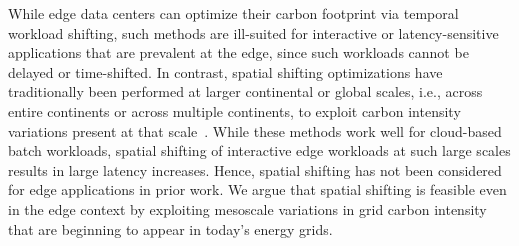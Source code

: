 While edge data centers can optimize their carbon footprint via temporal workload shifting, such methods are ill-suited for interactive or latency-sensitive applications that are prevalent at the edge, since such workloads cannot be delayed or time-shifted. In contrast, spatial shifting optimizations have traditionally been performed at larger continental or global scales, i.e., across entire continents or across multiple continents, to exploit carbon intensity variations present at that scale~\cite{cloudcarbon, Gsteiger2024:Caribou, sukprasert2024limitations}. While these methods work well for cloud-based batch workloads, spatial shifting of interactive edge workloads at such large scales results in large latency increases. Hence, spatial shifting has not been considered for edge applications in prior work. We argue that spatial shifting is feasible even in the edge context by exploiting mesoscale variations in grid carbon intensity that are beginning to appear in today's energy grids. 









